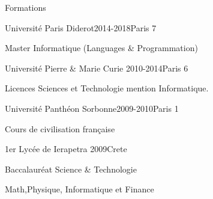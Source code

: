 \documentclass{resume} %
\begin{document}

\begin{rSection}{Formations}
		
	\begin{rSubsection}{ Université Paris Diderot}{2014-2018}{}{Paris 7}
		\item Master Informatique (Languages \& Programmation)
	\end{rSubsection}
	\begin{rSubsection}{ Université Pierre \& Marie Curie }{2010-2014}{}{Paris 6}
		\item Licences Sciences et Technologie mention Informatique.
	\end{rSubsection}
	\begin{rSubsection}{ Université Panthéon Sorbonne}{2009-2010}{}{Paris 1}
		\item Cours de civilisation française
	\end{rSubsection}
	
	\begin{rSubsection}{ 1er Lycée de Ierapetra }{2009}{}{Crete}
		\item Baccalauréat Science \& Technologie
		\item Math,Physique, Informatique et Finance
	\end{rSubsection}
	
\end{rSection}

\end{document}
